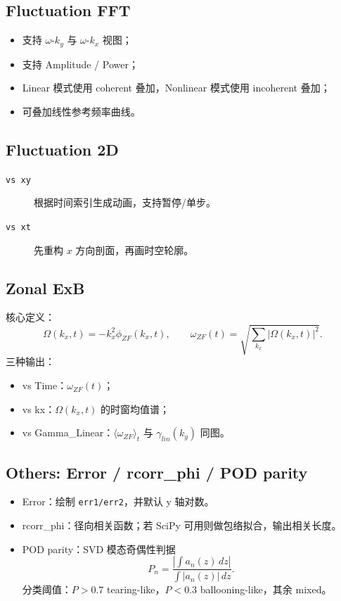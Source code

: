 \documentclass[11pt,a4paper]{ctexart}
\begin{document}
\subsection{Fluctuation FFT}
\begin{itemize}
  \item 支持 \( \omega\)-\(k_y \) 与 \( \omega\)-\(k_x \) 视图；
  \item 支持 Amplitude / Power；
  \item Linear 模式使用 coherent 叠加，Nonlinear 模式使用 incoherent 叠加；
  \item 可叠加线性参考频率曲线。
\end{itemize}

\subsection{Fluctuation 2D}
\begin{description}
  \item[\texttt{vs xy}] 根据时间索引生成动画，支持暂停/单步。
  \item[\texttt{vs xt}] 先重构 \(x\) 方向剖面，再画时空轮廓。
\end{description}

\subsection{Zonal ExB}
核心定义：
\[
\Omega(k_x,t)=-k_x^2\phi_{ZF}(k_x,t),\qquad
\omega_{ZF}(t)=\sqrt{\sum_{k_x}|\Omega(k_x,t)|^2}.
\]
三种输出：
\begin{itemize}
  \item vs Time：\(\omega_{ZF}(t)\)；
  \item vs kx：\(\Omega(k_x,t)\) 的时窗均值谱；
  \item vs Gamma\_Linear：\(\langle\omega_{ZF}\rangle_t\) 与 \(\gamma_{lin}(k_y)\) 同图。
\end{itemize}

\subsection{Others: Error / rcorr\_phi / POD parity}
\begin{itemize}
  \item Error：绘制 \texttt{err1/err2}，并默认 y 轴对数。
  \item rcorr\_phi：径向相关函数；若 SciPy 可用则做包络拟合，输出相关长度。
  \item POD parity：SVD 模态奇偶性判据
  \[
  P_n=\frac{|\int a_n(z)\,dz|}{\int |a_n(z)|\,dz}.
  \]
  分类阈值：\(P>0.7\) tearing-like，\(P<0.3\) ballooning-like，其余 mixed。
\end{itemize}
\end{document}
